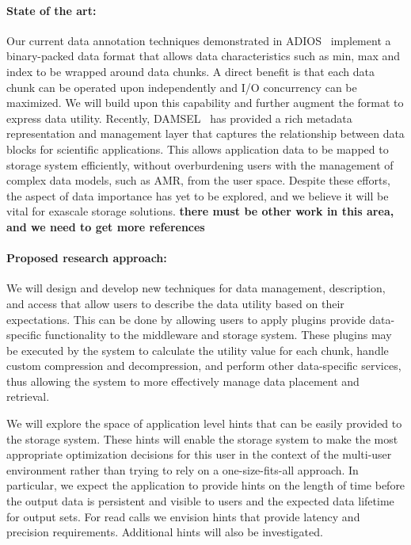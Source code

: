 \paragraph{State of the art:}
Our current data annotation techniques demonstrated in
ADIOS~\cite{lofstead:2009:adaptible} implement a binary-packed data format that
allows data characteristics such as min, max and index to be wrapped around
data chunks. A direct benefit is that each data chunk can be operated upon
independently and I/O concurrency can be maximized. We will build upon this
capability and further augment the format to express data utility.
Recently,
DAMSEL~\cite{damsel} has provided a rich metadata representation and management
layer that captures the relationship between data blocks for scientific
applications.  This allows application data to be mapped to storage system
efficiently, without overburdening users with the management of complex data models, such
as AMR, from the user space. Despite these efforts, the aspect of data importance has yet to be 
explored, and we believe it will be vital for exascale storage solutions.
{\color{red}\bf there must be other work in this area, and we need to get more
references}

\paragraph{Proposed research approach:} 
We will design and develop new techniques for data management, description,
and access that allow users to describe the data utility based on their
expectations. This can be done by allowing users to apply plugins
provide data-specific functionality to the middleware and storage system.
These plugins may be executed by the system to
calculate the utility value for each chunk, handle custom compression
and decompression, and perform other data-specific services, thus allowing
the system to more effectively manage data placement and retrieval.
%

We will explore the space of application level hints that can be easily provided
to the storage system. These hints will enable the storage system to make the
most appropriate optimization decisions for this user in the context of the
multi-user environment rather than trying to rely on a one-size-fits-all
approach. In particular, we expect the application to provide hints on the
length of time before the output data is persistent and visible to users and
the expected data lifetime for output sets. For read calls we envision
hints that provide latency and precision requirements. Additional hints will
also be investigated.

